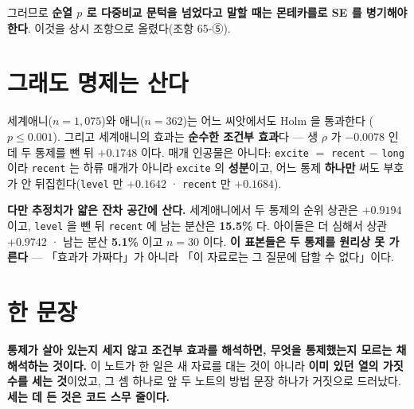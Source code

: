 \documentclass[10pt]{article}
\begin{document}
그러므로 \textbf{순열 $p$ 로 다중비교 문턱을 넘었다고 말할 때는 몬테카를로 SE 를
병기해야 한다}. 이것을 상시 조항으로 올렸다(조항 65-⑤).

\section{그래도 명제는 산다}

세계애니($n{=}1{,}075$)와 애니($n{=}362$)는 어느 씨앗에서도 Holm 을 통과한다
($p \le 0.001$). 그리고 세계애니의 효과는 \textbf{순수한 조건부 효과}다 ---
생 $\rho$ 가 $-0.0078$ 인데 두 통제를 뺀 뒤 $+0.1748$ 이다. 매개 인공물은 아니다:
\texttt{excite} $=$ \texttt{recent} $-$ \texttt{long} 이라 \texttt{recent} 는 하류
매개가 아니라 \texttt{excite} 의 \textbf{성분}이고, 어느 통제 \textbf{하나만} 써도
부호가 안 뒤집힌다(\texttt{level} 만 $+0.1642$ · \texttt{recent} 만 $+0.1684$).

\textbf{다만 추정치가 얇은 잔차 공간에 산다.} 세계애니에서 두 통제의 순위 상관은
$+0.9194$ 이고, \texttt{level} 을 뺀 뒤 \texttt{recent} 에 남는 분산은
\textbf{15.5\%} 다. 아이돌은 더 심해서 상관 $+0.9742$ · 남는 분산 \textbf{5.1\%} 이고
$n{=}30$ 이다. \textbf{이 표본들은 두 통제를 원리상 못 가른다} --- 「효과가 가짜다」가
아니라 「이 자료로는 그 질문에 답할 수 없다」이다.

\section{한 문장}

\textbf{통제가 살아 있는지 세지 않고 조건부 효과를 해석하면, 무엇을 통제했는지 모르는 채
해석하는 것이다.} 이 노트가 한 일은 새 자료를 대는 것이 아니라 \textbf{이미 있던 열의
가짓수를 세는 것}이었고, 그 셈 하나로 앞 두 노트의 방법 문장 하나가 거짓으로 드러났다.
\textbf{세는 데 든 것은 코드 스무 줄이다.}
\end{document}
